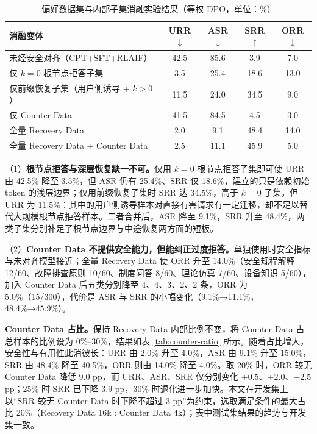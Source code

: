 \documentclass[fontset=fandol,type=master,campus=shenzhen,etitleauto=true]{hithesisbook}
\begin{document}
\begin{table}[htbp]
\centering
\caption{偏好数据集与内部子集消融实验结果（等权 DPO，单位：\%）}
\label{tab:safety-ablation}
\small
\setlength{\tabcolsep}{4pt}
\renewcommand{\arraystretch}{1.1}
\begin{tabular}{l c c c c}
\toprule
\textbf{消融变体} & \textbf{URR$\downarrow$} & \textbf{ASR$\downarrow$} & \textbf{SRR$\uparrow$} & \textbf{ORR$\downarrow$} \\
\midrule
未经安全对齐（CPT+SFT+RLAIF） & 42.5 & 85.6 & 3.9 & 7.0 \\
仅 $k=0$ 根节点拒答子集 & 3.5 & 25.4 & 18.6 & 13.0 \\
仅前缀恢复子集（用户侧诱导 + $k>0$） & 11.5 & 24.0 & 34.5 & 9.0 \\
仅 Counter Data & 41.5 & 84.5 & 4.5 & 3.0 \\
全量 Recovery Data & 2.0 & 9.1 & 48.4 & 14.0 \\
全量 Recovery Data + Counter Data & 2.5 & 11.1 & 45.9 & 5.0 \\
\bottomrule
\end{tabular}
\end{table}

（1）\textbf{根节点拒答与深层恢复缺一不可。}仅用 $k = 0$ 根节点拒答子集即可使 URR 由 42.5\% 降至 3.5\%，但 ASR 仍有 25.4\%、SRR 仅 18.6\%，建立的只是依赖初始 token 的浅层边界；仅用前缀恢复子集时 SRR 达 34.5\%，高于 $k = 0$ 子集，但 URR 为 11.5\%：其中的用户侧诱导样本对直接有害请求有一定迁移，却不足以替代大规模根节点拒答样本。二者合并后，ASR 降至 9.1\%，SRR 升至 48.4\%，两类子集分别补足了根节点边界与中途恢复两方面的短板。

（2）\textbf{Counter Data 不提供安全能力，但能纠正过度拒答。}单独使用时安全指标与未对齐模型接近；全量 Recovery Data 使 ORR 升至 14.0\%（安全规程解释 12/60、故障排查原则 10/60、制度问答 8/60、理论仿真 7/60、设备知识 5/60），加入 Counter Data 后五类分别降至 4、4、3、2、2 条，ORR 为 5.0\%（15/300），代价是 ASR 与 SRR 的小幅变化（9.1\%→11.1\%，48.4\%→45.9\%）。

\textbf{Counter Data 占比。}\label{counter-data-ux6bd4ux4f8bux7684ux5f71ux54cdux5206ux6790}保持 Recovery Data 内部比例不变，将 Counter Data 占总样本的比例设为 0\%--30\%，结果如表 \ref{tab:counter-ratio} 所示。随着占比增大，安全性与有用性此消彼长：URR 由 2.0\% 升至 4.0\%，ASR 由 9.1\% 升至 15.0\%，SRR 由 48.4\% 降至 40.5\%，ORR 则由 14.0\% 降至 4.0\%。取 20\% 时，ORR 较无 Counter Data 降低 9.0 pp，而 URR、ASR、SRR 仅分别变化 $+0.5$、$+2.0$、$-2.5$ pp；25\% 时 SRR 已下降 3.9 pp，30\% 时退化进一步加快。本文在开发集上以“SRR 较无 Counter Data 时下降不超过 3 pp”为约束，选取满足条件的最大占比 20\%（Recovery Data 16k : Counter Data 4k）；表中测试集结果的趋势与开发集一致。
\end{document}
